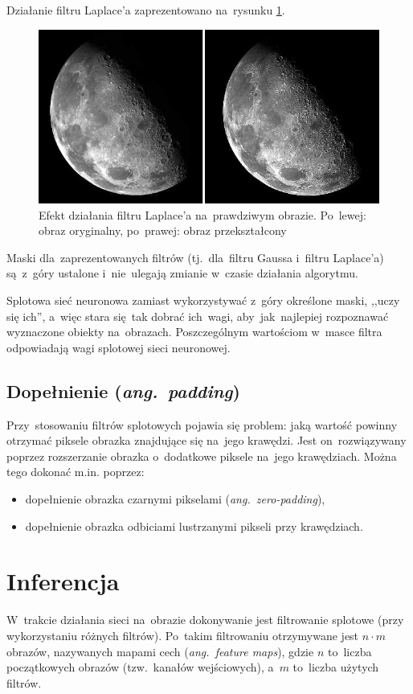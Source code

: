Działanie filtru Laplace'a zaprezentowano na~rysunku \ref{rys:laplace-conv-example}.

\begin{figure}[H]
	\centering
	\includegraphics[width=\linewidth]{img/laplace-conv-example.png}
	\caption{Efekt działania filtru Laplace'a na~prawdziwym obrazie. Po~lewej: obraz oryginalny, po~prawej: obraz
	przekształcony}
	\label{rys:laplace-conv-example}
\end{figure}

Maski dla~zaprezentowanych filtrów (tj.~dla~filtru Gaussa i~filtru Laplace'a) są~z~góry ustalone i~nie~ulegają zmianie
w~czasie działania algorytmu.

Splotowa sieć neuronowa zamiast wykorzystywać z~góry określone maski, ,,uczy się ich'',
a~więc stara się~tak dobrać ich~wagi, aby~jak~najlepiej rozpoznawać wyznaczone obiekty na~obrazach. Poszczególnym
wartościom w~masce filtra odpowiadają wagi splotowej sieci neuronowej.

\subsection{Dopełnienie (\textit{ang.~padding})}
Przy~stosowaniu filtrów splotowych pojawia się problem: jaką wartość powinny otrzymać piksele obrazka
znajdujące się na~jego krawędzi. Jest on~rozwiązywany poprzez rozszerzanie obrazka o~dodatkowe piksele
na~jego krawędziach. Można tego dokonać m.in. poprzez:
\begin{itemize}
  \item dopełnienie obrazka czarnymi pikselami (\textit{ang.~zero-padding}),
  \item dopełnienie obrazka odbiciami lustrzanymi pikseli przy krawędziach.
\end{itemize}

\section{Inferencja} \label{sec:inferencja}
W~trakcie działania sieci na~obrazie dokonywanie jest filtrowanie splotowe (przy wykorzystaniu różnych
filtrów). Po~takim filtrowaniu otrzymywane jest $n\cdot m$ obrazów, nazywanych mapami cech
(\textit{ang.~feature maps}), gdzie $n$ to~liczba początkowych obrazów (tzw.~kanałów wejściowych), a~$m$ to~liczba
użytych filtrów.

